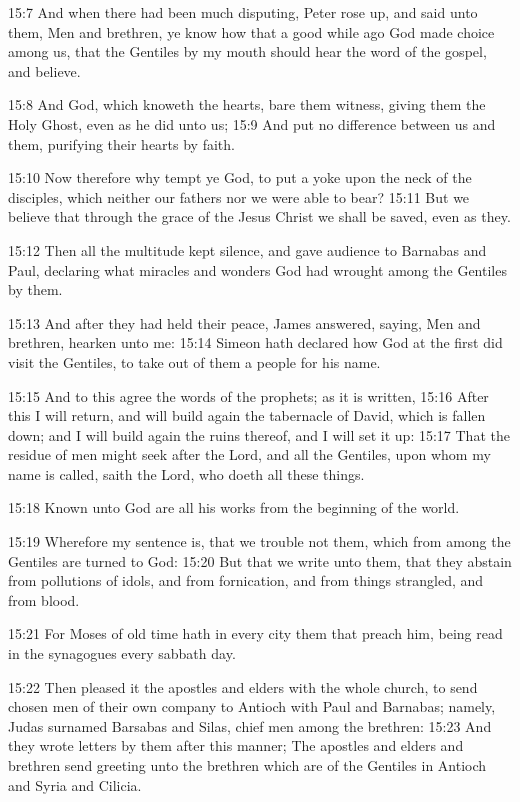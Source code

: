 15:7 And when there had been much disputing, Peter rose up, and said unto them, Men and brethren, ye know how that a good while ago God made choice among us, that the Gentiles by my mouth should hear the word of the gospel, and believe.

15:8 And God, which knoweth the hearts, bare them witness, giving them the Holy Ghost, even as he did unto us; 15:9 And put no difference between us and them, purifying their hearts by faith.

15:10 Now therefore why tempt ye God, to put a yoke upon the neck of the disciples, which neither our fathers nor we were able to bear?  15:11 But we believe that through the grace of the \LORD Jesus Christ we shall be saved, even as they.

15:12 Then all the multitude kept silence, and gave audience to Barnabas and Paul, declaring what miracles and wonders God had wrought among the Gentiles by them.

15:13 And after they had held their peace, James answered, saying, Men and brethren, hearken unto me: 15:14 Simeon hath declared how God at the first did visit the Gentiles, to take out of them a people for his name.

15:15 And to this agree the words of the prophets; as it is written, 15:16 After this I will return, and will build again the tabernacle of David, which is fallen down; and I will build again the ruins thereof, and I will set it up: 15:17 That the residue of men might seek after the Lord, and all the Gentiles, upon whom my name is called, saith the Lord, who doeth all these things.

15:18 Known unto God are all his works from the beginning of the world.

15:19 Wherefore my sentence is, that we trouble not them, which from among the Gentiles are turned to God: 15:20 But that we write unto them, that they abstain from pollutions of idols, and from fornication, and from things strangled, and from blood.

15:21 For Moses of old time hath in every city them that preach him, being read in the synagogues every sabbath day.

15:22 Then pleased it the apostles and elders with the whole church, to send chosen men of their own company to Antioch with Paul and Barnabas; namely, Judas surnamed Barsabas and Silas, chief men among the brethren: 15:23 And they wrote letters by them after this manner; The apostles and elders and brethren send greeting unto the brethren which are of the Gentiles in Antioch and Syria and Cilicia.


